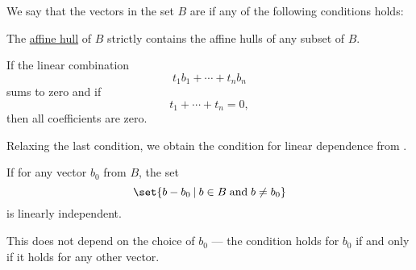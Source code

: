 \begin{definition}\label{def:affine_dependence}\mimprovised
  We say that the vectors in the set \( B \) are  if any of the following conditions holds:

  \begin{thmenum}
     The \hyperref[def:affine_hull]{affine hull} of \( B \) strictly contains the affine hulls of any subset of \( B \).

     If the linear combination
    \begin{equation*}
      t_1 b_1 + \cdots + t_n b_n
    \end{equation*}
    sums to zero and if
    \begin{equation*}
      t_1 + \cdots + t_n = 0,
    \end{equation*}
    then all coefficients are zero.

    Relaxing the last condition, we obtain the condition for linear dependence from .

     If for any vector \( b_0 \) from \( B \), the set
    \begin{equation*}
      \set{ b - b_0 \given b \in B \T{and} b \neq b_0 }
    \end{equation*}
    is linearly independent.

    This does not depend on the choice of \( b_0 \) --- the condition holds for \( b_0 \) if and only if it holds for any other vector.
  \end{thmenum}
\end{definition}
